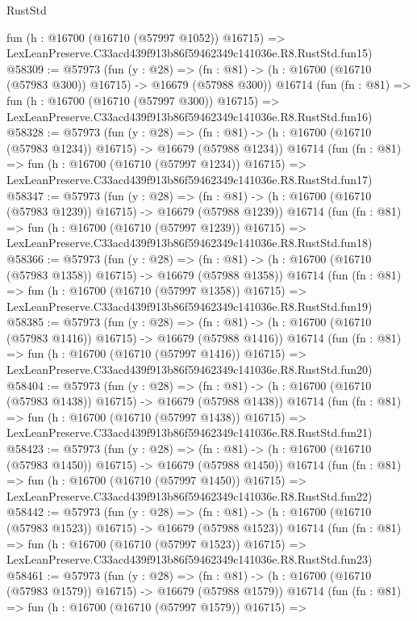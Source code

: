 \begin{lexlean}{RustStd}
\begin{coremodule}
    fun (h : @16700 (@16710 (@57997 @1052)) @16715) =>
    LexLeanPreserve.C33acd439f913b86f59462349c141036e.R8.RustStd.fun15)
@58309 := @57973
    (fun (y : @28) =>
    (fn : @81) -> (h : @16700 (@16710 (@57983 @300)) @16715) -> @16679 (@57988 @300))
    @16714
    (fun (fn : @81) =>
    fun (h : @16700 (@16710 (@57997 @300)) @16715) =>
    LexLeanPreserve.C33acd439f913b86f59462349c141036e.R8.RustStd.fun16)
@58328 := @57973
    (fun (y : @28) =>
    (fn : @81) -> (h : @16700 (@16710 (@57983 @1234)) @16715) -> @16679 (@57988 @1234))
    @16714
    (fun (fn : @81) =>
    fun (h : @16700 (@16710 (@57997 @1234)) @16715) =>
    LexLeanPreserve.C33acd439f913b86f59462349c141036e.R8.RustStd.fun17)
@58347 := @57973
    (fun (y : @28) =>
    (fn : @81) -> (h : @16700 (@16710 (@57983 @1239)) @16715) -> @16679 (@57988 @1239))
    @16714
    (fun (fn : @81) =>
    fun (h : @16700 (@16710 (@57997 @1239)) @16715) =>
    LexLeanPreserve.C33acd439f913b86f59462349c141036e.R8.RustStd.fun18)
@58366 := @57973
    (fun (y : @28) =>
    (fn : @81) -> (h : @16700 (@16710 (@57983 @1358)) @16715) -> @16679 (@57988 @1358))
    @16714
    (fun (fn : @81) =>
    fun (h : @16700 (@16710 (@57997 @1358)) @16715) =>
    LexLeanPreserve.C33acd439f913b86f59462349c141036e.R8.RustStd.fun19)
@58385 := @57973
    (fun (y : @28) =>
    (fn : @81) -> (h : @16700 (@16710 (@57983 @1416)) @16715) -> @16679 (@57988 @1416))
    @16714
    (fun (fn : @81) =>
    fun (h : @16700 (@16710 (@57997 @1416)) @16715) =>
    LexLeanPreserve.C33acd439f913b86f59462349c141036e.R8.RustStd.fun20)
@58404 := @57973
    (fun (y : @28) =>
    (fn : @81) -> (h : @16700 (@16710 (@57983 @1438)) @16715) -> @16679 (@57988 @1438))
    @16714
    (fun (fn : @81) =>
    fun (h : @16700 (@16710 (@57997 @1438)) @16715) =>
    LexLeanPreserve.C33acd439f913b86f59462349c141036e.R8.RustStd.fun21)
@58423 := @57973
    (fun (y : @28) =>
    (fn : @81) -> (h : @16700 (@16710 (@57983 @1450)) @16715) -> @16679 (@57988 @1450))
    @16714
    (fun (fn : @81) =>
    fun (h : @16700 (@16710 (@57997 @1450)) @16715) =>
    LexLeanPreserve.C33acd439f913b86f59462349c141036e.R8.RustStd.fun22)
@58442 := @57973
    (fun (y : @28) =>
    (fn : @81) -> (h : @16700 (@16710 (@57983 @1523)) @16715) -> @16679 (@57988 @1523))
    @16714
    (fun (fn : @81) =>
    fun (h : @16700 (@16710 (@57997 @1523)) @16715) =>
    LexLeanPreserve.C33acd439f913b86f59462349c141036e.R8.RustStd.fun23)
@58461 := @57973
    (fun (y : @28) =>
    (fn : @81) -> (h : @16700 (@16710 (@57983 @1579)) @16715) -> @16679 (@57988 @1579))
    @16714
    (fun (fn : @81) =>
    fun (h : @16700 (@16710 (@57997 @1579)) @16715) =>

\end{coremodule}
\end{lexlean}

